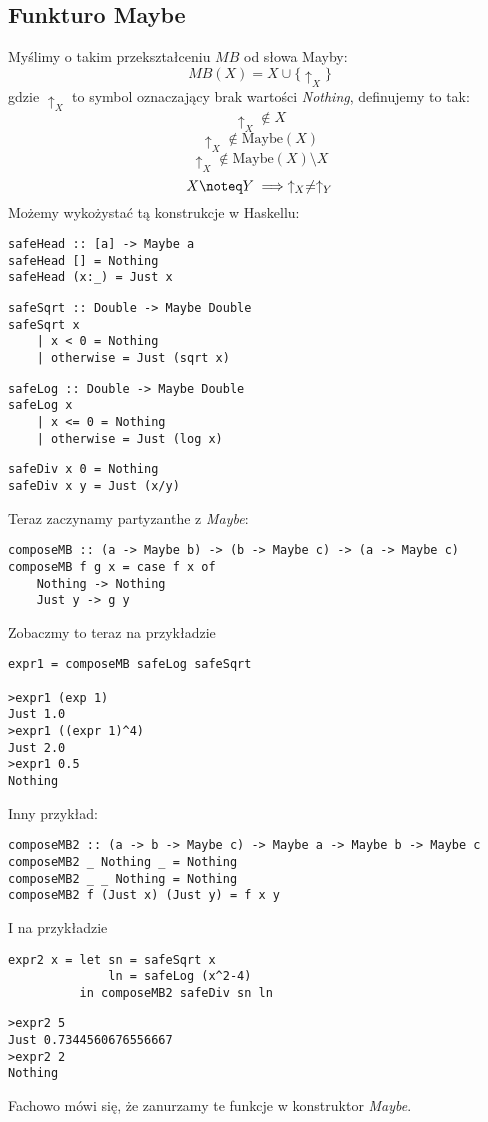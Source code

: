 \documentclass[11pt,a4paper]{article}
\begin{document}
\subsection{Funkturo Maybe}
Myślimy o takim przekształceniu  $MB$ od słowa Mayby:
\[
    MB(X) = X \cup \{ \uparrow_X \}
\]
gdzie $\uparrow_X$ to symbol oznaczający brak wartości \textit{Nothing}, definujemy to tak:
\[
    \uparrow_X \notin X
\]
\[
    \uparrow_X \notin \text{Maybe}(X)
\]
\[
    \uparrow_X \notin \text{Maybe}(X) \setminus X
\]
\[
    X \noteq Y \implies \uparrow_X \neq \uparrow_Y
\]
Możemy wykożystać tą konstrukcje w Haskellu:
\begin{Verbatim}[frame=single]
safeHead :: [a] -> Maybe a
safeHead [] = Nothing
safeHead (x:_) = Just x
\end{Verbatim}
\begin{Verbatim}[frame=single]
safeSqrt :: Double -> Maybe Double
safeSqrt x
    | x < 0 = Nothing
    | otherwise = Just (sqrt x)
\end{Verbatim}
\begin{Verbatim}[frame=single]
safeLog :: Double -> Maybe Double
safeLog x
    | x <= 0 = Nothing
    | otherwise = Just (log x)
\end{Verbatim}
\begin{Verbatim}[frame=single]
safeDiv x 0 = Nothing
safeDiv x y = Just (x/y)
\end{Verbatim}
Teraz zaczynamy partyzanthe z \textit{Maybe}:
\begin{Verbatim}[frame=single]
composeMB :: (a -> Maybe b) -> (b -> Maybe c) -> (a -> Maybe c)
composeMB f g x = case f x of
    Nothing -> Nothing
    Just y -> g y
\end{Verbatim}
Zobaczmy to teraz na przykładzie
\begin{Verbatim}[frame=single]
expr1 = composeMB safeLog safeSqrt

>expr1 (exp 1)
Just 1.0
>expr1 ((expr 1)^4)
Just 2.0
>expr1 0.5
Nothing
\end{Verbatim}
Inny przykład:
\begin{Verbatim}[frame=single]
composeMB2 :: (a -> b -> Maybe c) -> Maybe a -> Maybe b -> Maybe c
composeMB2 _ Nothing _ = Nothing
composeMB2 _ _ Nothing = Nothing
composeMB2 f (Just x) (Just y) = f x y
\end{Verbatim}
I na przykładzie
\begin{Verbatim}[frame=single]
expr2 x = let sn = safeSqrt x
              ln = safeLog (x^2-4)
          in composeMB2 safeDiv sn ln
\end{Verbatim}
\begin{Verbatim}[frame=single]
>expr2 5
Just 0.7344560676556667
>expr2 2
Nothing
\end{Verbatim}
Fachowo mówi się, że zanurzamy te funkcje w konstruktor \textit{Maybe}.
\end{document}
